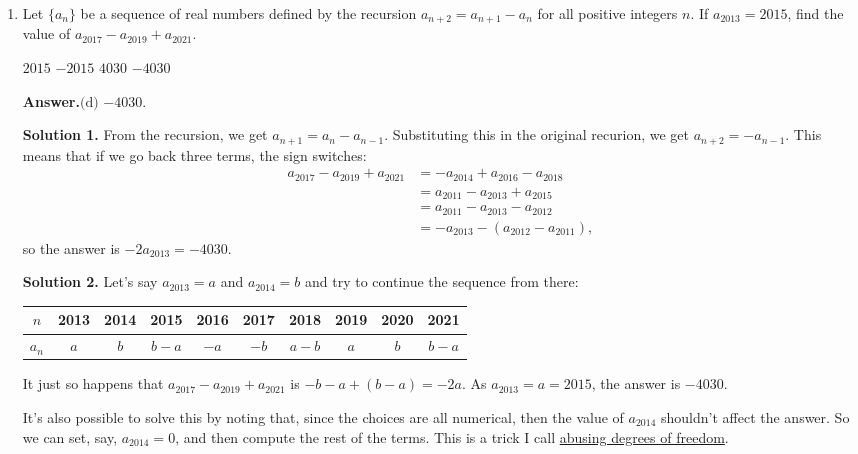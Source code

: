 \documentclass[11pt,paper=letter]{scrartcl}
\newcommand{\ans}{{\sffamily \bfseries Answer.}\;}
\newcommand{\ansb}[2]{\ans\(\boxed{\text{(#1) #2}}\).}
\newcommand{\sol}{{\sffamily \bfseries Solution.}\;}
\newcommand{\soln}[1]{{\sffamily \bfseries Solution #1.}\;}
\newenvironment{rem}%
{\noindent \ignorespaces \small \sffamily \sansmath {\bfseries Remark.}}%
{\ignorespacesafterend}
\begin{document}
\begin{enumerate}[left=0pt]
\fourch
{$8$}
{$8.2$}
{$8.4$}
{$8.6$}

\ansb{a}{$8$}

\sol Note that $AD$ bisects $\angle BAE$, and $AE$ bisects $\angle DAC$. So we apply the angle bisector theorem on each triangle. For $\triangle BAE$, we get that \[
  \frac{AB}{AE} = \frac{BD}{DE} \implies BD = DE \cdot \frac{AB}{AE} = 1.8 \cdot \frac{6}{2.7} = 4.
\]
And for $\triangle DAC$, we get that \[
  \frac{AD}{AC} = \frac{DE}{EC} \implies EC = DE \cdot \frac{AC}{AD} = 1.8 \cdot \frac{3.8}{3} = 2.28.
\]
Hence $BC = BD + DE + EC = 4 + 1.8 + 2.28 = 8.08$, so the answer is (a).

\item Let $\{a_n\}$ be a sequence of real numbers defined by the recursion $a_{n+2} = a_{n+1} - a_n$ for all positive integers $n$. If $a_{2013} = 2015$, find the value of $a_{2017} - a_{2019} + a_{2021}$.

\fourch
{$2015$}
{$-2015$}
{$4030$}
{$-4030$}

\ansb{d}{$-4030$}

\soln1 From the recursion, we get $a_{n+1} = a_n - a_{n-1}$. Substituting this in the original recurion, we get $a_{n+2} = -a_{n-1}$. This means that if we go back three terms, the sign switches:
\begin{align*}
a_{2017} - a_{2019} + a_{2021}
&= -a_{2014} + a_{2016} - a_{2018} \\
&= a_{2011} - a_{2013} + a_{2015} \\
&= a_{2011} - a_{2013} - a_{2012} \\
&= -a_{2013} - \left(a_{2012} - a_{2011}\right),
\end{align*}
so the answer is $-2a_{2013} = -4030$.

\soln2 Let's say $a_{2013} = a$ and $a_{2014} = b$ and try to continue the sequence from there:
\begin{center}
\begin{tabular}{c|ccccccccc}
$n$ & 2013 & 2014 & 2015 & 2016 & 2017 & 2018 & 2019 & 2020 & 2021 \\ \hline
$a_n$ & $a$ & $b$ & $b-a$ & $-a$ & $-b$ & $a-b$ & $a$ & $b$ & $b-a$
\end{tabular}
\end{center}
It just so happens that $a_{2017} - a_{2019} + a_{2021}$ is $-b-a+(b-a) = -2a$. As $a_{2013} = a = 2015$, the answer is $-4030$.

\begin{rem}
It's also possible to solve this by noting that, since the choices are all numerical, then the value of $a_{2014}$ shouldn't affect the answer. So we can set, say, $a_{2014} = 0$, and then compute the rest of the terms. This is a trick I call \href{https://cjquines.com/files/engineering.pdf}{abusing degrees of freedom}.
\end{rem}


\end{enumerate}
\end{document}
